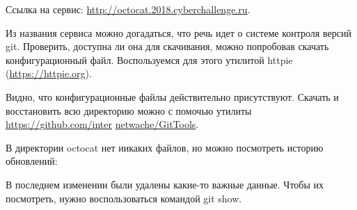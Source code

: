 
Ссылка на сервис: \url{http://octocat.2018.cyberchallenge.ru}.

\solutionSection

Из названия сервиса можно догадаться, что речь идет о системе контроля версий git. Проверить, доступна ли она для скачивания, можно попробовав скачать конфигурационный файл. Воспользуемся для этого утилитой httpie (\url{https://httpie.org}).


Видно, что конфигурационные файлы действительно присутствуют. Скачать и восстановить всю директорию можно с помочью утилиты \url{https://github.com/inter} \linebreak\url{netwache/GitTools}.


В директории octocat нет никаких файлов, но можно посмотреть историю обновлений:


В последнем изменении были удалены какие-то важные данные. Чтобы их посмотреть, нужно воспользоваться командой git show.


